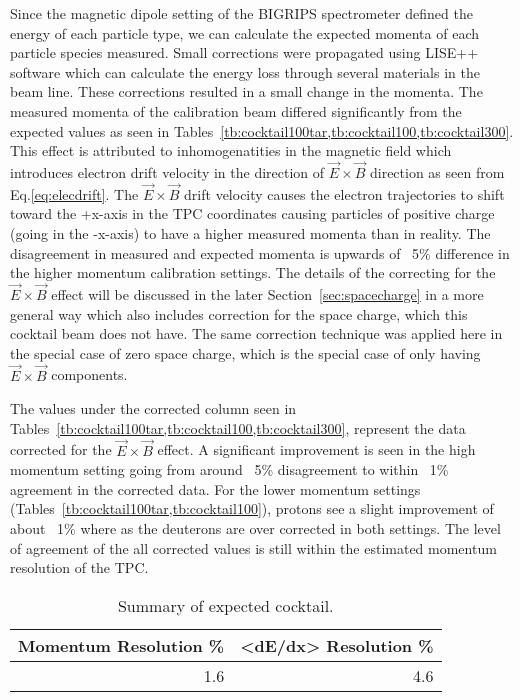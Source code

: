 Since the magnetic dipole setting of the BIGRIPS spectrometer defined the energy of each particle type, we can calculate the expected momenta of each particle species measured. Small corrections were propagated using LISE++ software which can calculate the energy loss through several materials in the beam line. These corrections resulted in a small change in the momenta. The measured momenta of the calibration beam differed significantly from the expected values as seen in Tables~\cref{tb:cocktail100tar,tb:cocktail100,tb:cocktail300}. This effect is attributed to inhomogenatities in the magnetic field which introduces electron drift velocity in the direction of $\vec{E}\times\vec{B}$ direction as seen from Eq.\ref{eq:elecdrift}. The $\vec{E}\times\vec{B}$ drift velocity causes the electron trajectories to shift toward the +x-axis in the TPC coordinates causing particles of positive charge (going in the -x-axis) to have a higher measured momenta than in reality. The disagreement in measured and expected momenta is upwards of ~5\% difference in the higher momentum calibration settings. The details of the correcting for the $\vec{E}\times\vec{B}$ effect will be discussed in the later Section~\ref{sec:spacecharge} in a more general way which also includes correction for the space charge, which this cocktail beam does not have. The same correction technique was applied here in the special case of zero space charge, which is the special case of only having $\vec{E}\times\vec{B}$ components.

The values under the corrected column seen in Tables~\cref{tb:cocktail100tar,tb:cocktail100,tb:cocktail300}, represent the data corrected for the $\vec{E}\times\vec{B}$ effect. A significant improvement is seen in the high momentum setting going from around ~5\% disagreement to within ~1\% agreement in the corrected data. For the lower momentum settings (Tables~\cref{tb:cocktail100tar,tb:cocktail100}), protons see a slight improvement of about ~1\% where as the deuterons are over corrected in both settings. The level of agreement of the all corrected values is still within the estimated momentum resolution of the TPC. 

\begin{table*}\centering
{}
\begin{tabular}{@{}rr@{}}\toprule
Momentum Resolution \% & <dE/dx> Resolution \% \\
\midrule
1.6  & 4.6\\
\bottomrule
\end{tabular}
\caption{Summary of expected cocktail. }
\label{tb:momresolution}
\end{table*}

